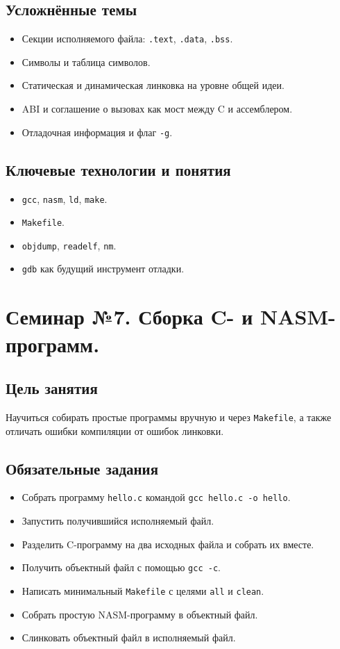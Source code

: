 \subsection*{Усложнённые темы}
\begin{itemize}
    \item Секции исполняемого файла: \texttt{.text}, \texttt{.data}, \texttt{.bss}.
    \item Символы и таблица символов.
    \item Статическая и динамическая линковка на уровне общей идеи.
    \item ABI и соглашение о вызовах как мост между C и ассемблером.
    \item Отладочная информация и флаг \texttt{-g}.
\end{itemize}

\subsection*{Ключевые технологии и понятия}
\begin{itemize}
    \item \texttt{gcc}, \texttt{nasm}, \texttt{ld}, \texttt{make}.
    \item \texttt{Makefile}.
    \item \texttt{objdump}, \texttt{readelf}, \texttt{nm}.
    \item \texttt{gdb} как будущий инструмент отладки.
\end{itemize}

\newpage
\section{Семинар №7. Сборка C- и NASM-программ.}

\subsection*{Цель занятия}
Научиться собирать простые программы вручную и через \texttt{Makefile}, а также отличать ошибки компиляции от ошибок линковки.

\subsection*{Обязательные задания}
\begin{itemize}
    \item Собрать программу \texttt{hello.c} командой \texttt{gcc hello.c -o hello}.
    \item Запустить получившийся исполняемый файл.
    \item Разделить C-программу на два исходных файла и собрать их вместе.
    \item Получить объектный файл с помощью \texttt{gcc -c}.
    \item Написать минимальный \texttt{Makefile} с целями \texttt{all} и \texttt{clean}.
    \item Собрать простую NASM-программу в объектный файл.
    \item Слинковать объектный файл в исполняемый файл.
\end{itemize}

